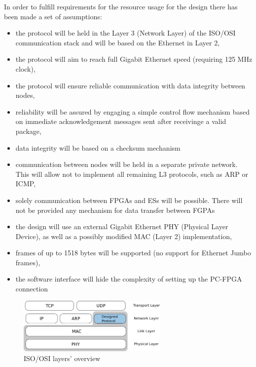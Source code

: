 \documentclass[12pt,a4paper]{article}
\begin{document}
In order to fulfill requirements for the resource usage for the design there has been made a set of assumptions:
\begin{itemize}
\item the protocol will be held in the Layer 3 (Network Layer) of the ISO/OSI communication stack and will be based on the Ethernet in Layer 2,
\item the protocol will aim to reach full Gigabit Ethernet speed (requiring 125 MHz clock), 
\item the protocol will ensure reliable communication with data integrity between nodes,
\item reliability will be assured by engaging a simple control flow mechanism based on immediate acknowledgement messages sent after receivinge a valid package,
\item data integrity will be based on a checksum mechanism 
\item communication between nodes will be held in a separate private network. This will allow not to implement all remaining L3 protocols, such as ARP or ICMP,
\item solely communication between FPGAs and ESs will be possible. There will not be provided any mechanism for data transfer between FGPAs
\item the design will use an external Gigabit Ethernet PHY (Physical Layer Device), as well as a possibly modified MAC (Layer 2) implementation,
\item frames of up to 1518 bytes will be supported (no support for Ethernet Jumbo frames),
\item the software interface will hide the complexity of setting up the PC-FPGA connection
\end{itemize}
                \begin{figure}[h!]
                \begin{center}
                \includegraphics[width=0.65\textwidth]{osi.png}
                \caption{ISO/OSI layers' overview}
                \end{center}
                \end{figure}
\end{document}
